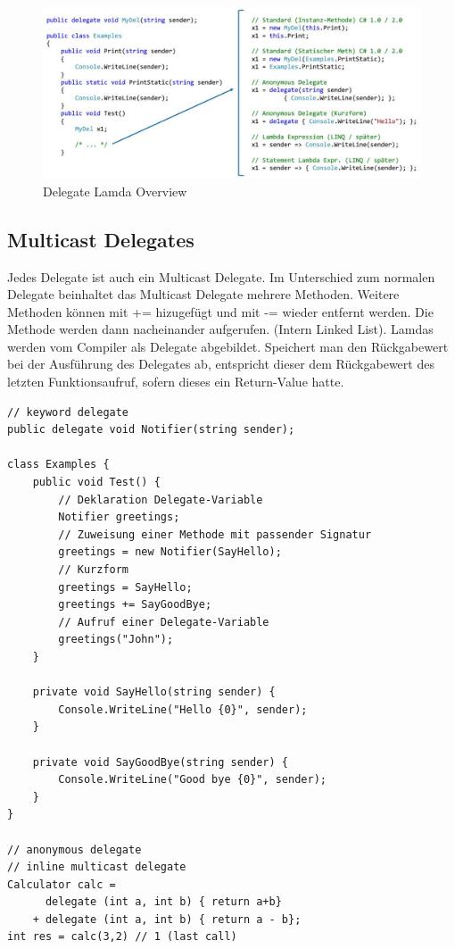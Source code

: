 \documentclass[
a4paper,
oneside,
10pt,
fleqn,
headsepline,
toc=listofnumbered, 
bibliography=totocnumbered]{scrartcl}
\begin{document}
\begin{figure}[ht]
	\centering
	\includegraphics[width=0.9\linewidth]{images/delegate_lamda_overview}
	\caption{Delegate Lamda Overview}
\end{figure}

\subsection{Multicast Delegates}
Jedes Delegate ist auch ein Multicast Delegate. Im Unterschied zum normalen Delegate beinhaltet das Multicast Delegate mehrere Methoden. Weitere Methoden können mit += hizugefügt und mit -= wieder entfernt werden. Die Methode werden dann nacheinander aufgerufen. (Intern Linked List). Lamdas werden vom Compiler als Delegate abgebildet.  Speichert man den Rückgabewert bei der Ausführung des Delegates ab, entspricht dieser dem Rückgabewert des letzten Funktionsaufruf, sofern dieses ein Return-Value hatte.
\begin{lstlisting}
// keyword delegate
public delegate void Notifier(string sender);

class Examples {
	public void Test() {
		// Deklaration Delegate-Variable
		Notifier greetings; 
		// Zuweisung einer Methode mit passender Signatur
		greetings = new Notifier(SayHello); 
		// Kurzform
		greetings = SayHello;
		greetings += SayGoodBye;
		// Aufruf einer Delegate-Variable
		greetings("John");
	}

	private void SayHello(string sender) {
		Console.WriteLine("Hello {0}", sender);
	}
	
	private void SayGoodBye(string sender) {
		Console.WriteLine("Good bye {0}", sender);
	}
} 

// anonymous delegate
// inline multicast delegate
Calculator calc =  
	  delegate (int a, int b) { return a+b}
	+ delegate (int a, int b) { return a - b};
int res = calc(3,2) // 1 (last call)
\end{lstlisting}
\end{document}
